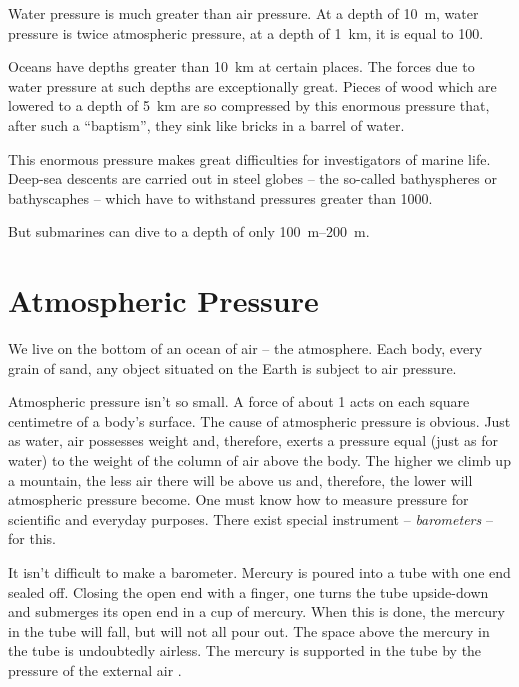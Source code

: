Water pressure is much greater than air pressure. At a depth of \SI{10}{\meter}, water pressure is twice atmospheric pressure, at a depth of \SI{1}{\kilo\meter}, it is equal to \SI{100}{\atmos}.

Oceans have depths greater than \SI{10}{\kilo\meter} at certain places. The forces due to water pressure at such depths are exceptionally great. Pieces of wood which are lowered to a depth of \SI{5}{\kilo\meter} are so compressed by this enormous pressure that, after such a ``baptism'', they sink like bricks in a barrel of water.

This enormous pressure makes great difficulties for investigators of marine life. Deep-sea descents are carried out in steel globes -- the so-called bathyspheres or bathyscaphes -- which have to withstand pressures greater than \SI{1000}{\atmos}.

But submarines can dive to a depth of only \SIrange{100}{200}{\meter}.

\section{Atmospheric Pressure}

We live on the bottom of an ocean of air -- the atmosphere. Each body, every grain of sand, any object situated on the Earth is subject to air pressure.

Atmospheric pressure isn't so small. A force of about \SI{1}{\kgf} acts on each square centimetre of a body's surface. The cause of atmospheric pressure is obvious. Just as water, air possesses weight and, therefore, exerts a pressure equal (just as for water) to the weight of the column of air above the body. The higher we climb up a mountain, the less air there will be above us and, therefore, the lower will atmospheric pressure become. One must know how to measure pressure for scientific
and everyday purposes. There exist special instrument -- \emph{barometers} -- for this.

It isn't difficult to make a barometer. Mercury is poured into a tube with one end sealed off. Closing the open end with a finger, one turns the tube upside-down and submerges its open end in a cup of mercury. When this is done, the mercury in the tube will fall, but will not all pour out. The space above the mercury in the tube is undoubtedly airless. The mercury is supported in the tube by the pressure of the external air .



